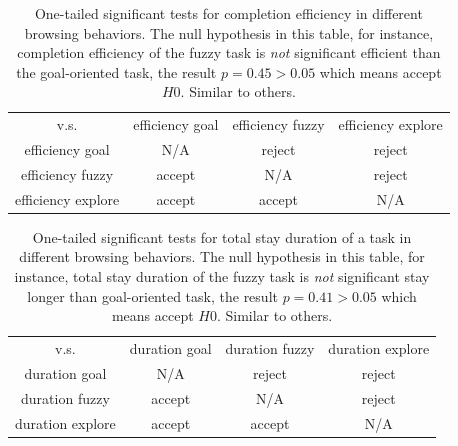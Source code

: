\begin{table}[H]
    \small
    \centering
    \caption{One-tailed significant tests for completion efficiency in different browsing behaviors.
    The null hypothesis in this table, for instance, completion efficiency of the fuzzy task
    is \emph{not} significant efficient than the goal-oriented task, the result $p=0.45>0.05$ which means
    accept $H0$. Similar to others.}
        \begin{tabular}{cccc}
            \toprule
              v.s.             & efficiency goal & efficiency fuzzy & efficiency explore \\
            efficiency goal    & N/A             & reject           & reject             \\
            efficiency fuzzy   & accept          & N/A              & reject             \\
            efficiency explore & accept          & accept           & N/A                \\
            \bottomrule
        \end{tabular}
        \label{table:sig-test-efficiency}
\end{table}

\begin{table}[H]
    \small
    \centering
    \caption{One-tailed significant tests for total stay duration of a task in different browsing behaviors.
    The null hypothesis in this table, for instance, total stay duration of the fuzzy task
    is \emph{not} significant stay longer than goal-oriented task, the result $p=0.41>0.05$ which means
    accept $H0$. Similar to others.}
        \begin{tabular}{cccc}
            \toprule
              v.s.             & duration goal & duration fuzzy & duration explore \\
            duration goal      & N/A & reject & reject \\
            duration fuzzy     & accept & N/A & reject \\
            duration explore   & accept & accept & N/A \\
            \bottomrule
        \end{tabular}
        \label{table:sig-test-duration}
\end{table}

